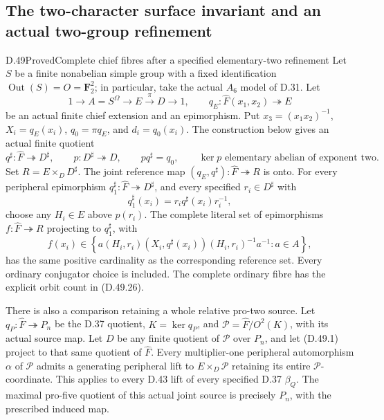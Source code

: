 \subsection{The two-character surface invariant and an actual two-group refinement}

\begin{statement}{D.49}{Proved}{Complete chief fibres after a specified elementary-two refinement}
Let \(S\) be a finite nonabelian simple group with a fixed identification
\(\operatorname{Out}(S)=O=\mathbf F_2^2\); in particular, take the actual
\(A_6\) model of D.31. Let
\[
 1\longrightarrow A=S^\Omega\longrightarrow E\xrightarrow{\pi}D
       \longrightarrow1,\qquad
 q_E:\widehat F(x_1,x_2)\twoheadrightarrow E
 \tag{D.49.1}
\]
be an actual finite chief extension and an epimorphism.
Put \(x_3=(x_1x_2)^{-1}\), \(X_i=q_E(x_i)\),
\(q_0=\pi q_E\), and \(d_i=q_0(x_i)\).
The construction below gives an actual finite quotient
\[
 q^\sharp:\widehat F\twoheadrightarrow D^\sharp,
 \qquad p:D^\sharp\twoheadrightarrow D,
 \qquad pq^\sharp=q_0,
 \qquad\ker p\text{ elementary abelian of exponent two}.
 \tag{D.49.2}
\]
Set \(R=E\times_DD^\sharp\). The joint reference map
\((q_E,q^\sharp):\widehat F\twoheadrightarrow R\) is onto.
For every peripheral epimorphism
\(q_1^\sharp:\widehat F\twoheadrightarrow D^\sharp\), and every specified
\(r_i\in D^\sharp\) with
\[
 q_1^\sharp(x_i)=r_iq^\sharp(x_i)r_i^{-1},
 \tag{D.49.3}
\]
choose any \(H_i\in E\) above \(p(r_i)\). The complete literal set of
epimorphisms \(f:\widehat F\twoheadrightarrow R\) projecting to
\(q_1^\sharp\), with
\[
 f(x_i)\in
 \left\{a(H_i,r_i)(X_i,q^\sharp(x_i))(H_i,r_i)^{-1}a^{-1}:a\in A\right\},
 \tag{D.49.4}
\]
has the same positive cardinality as the corresponding reference set.
Every ordinary conjugator choice is included. The complete ordinary fibre
has the explicit orbit count in \textup{(D.49.26)}.

There is also a comparison retaining a whole relative pro-two source.
Let \(q_P:\widehat F\twoheadrightarrow P_n\) be the D.37 quotient,
\(K=\ker q_P\), and \(\mathcal P=\widehat F/O^2(K)\), with its actual
source map. Let \(D\) be any finite quotient of \(\mathcal P\) over
\(P_n\), and let \textup{(D.49.1)} project to that same quotient of
\(\widehat F\). Every multiplier-one peripheral automorphism
\(\alpha\) of \(\mathcal P\) admits a generating peripheral lift to
\(E\times_D\mathcal P\) retaining its entire \(\mathcal P\)-coordinate.
This applies to every D.43 lift of every specified D.37 \(\beta_Q\).
The maximal pro-five quotient of this actual joint source is precisely
\(P_n\), with the prescribed induced map.
\end{statement}

